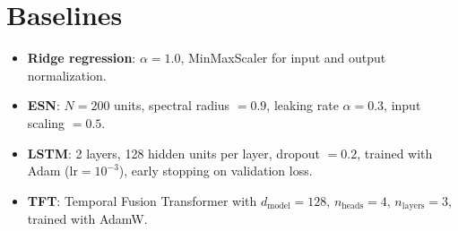 
\section{Baselines}


\begin{itemize}
  \item \textbf{Ridge regression}: $\alpha = 1.0$, MinMaxScaler for input
    and output normalization.
  \item \textbf{ESN}: $N = 200$ units, spectral radius $= 0.9$,
    leaking rate $\alpha = 0.3$, input scaling $= 0.5$.
  \item \textbf{LSTM}: 2 layers, 128 hidden units per layer,
    dropout $= 0.2$, trained with Adam ($\mathrm{lr} = 10^{-3}$),
    early stopping on validation loss.
  \item \textbf{TFT}: Temporal Fusion Transformer with
    $d_{\mathrm{model}} = 128$, $n_{\mathrm{heads}} = 4$,
    $n_{\mathrm{layers}} = 3$, trained with AdamW.
\end{itemize}

